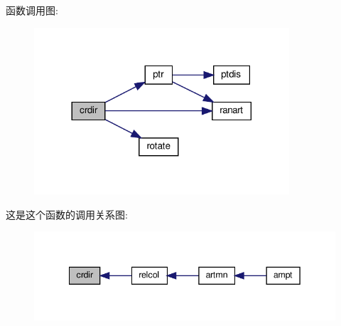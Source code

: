 函数调用图\+:
\nopagebreak
\begin{figure}[H]
\begin{center}
\leavevmode
\includegraphics[width=269pt]{crdir_8f90_a04a2637bb6d4fd8ed0884f717085ebd6_cgraph}
\end{center}
\end{figure}
这是这个函数的调用关系图\+:
\nopagebreak
\begin{figure}[H]
\begin{center}
\leavevmode
\includegraphics[width=342pt]{crdir_8f90_a04a2637bb6d4fd8ed0884f717085ebd6_icgraph}
\end{center}
\end{figure}
